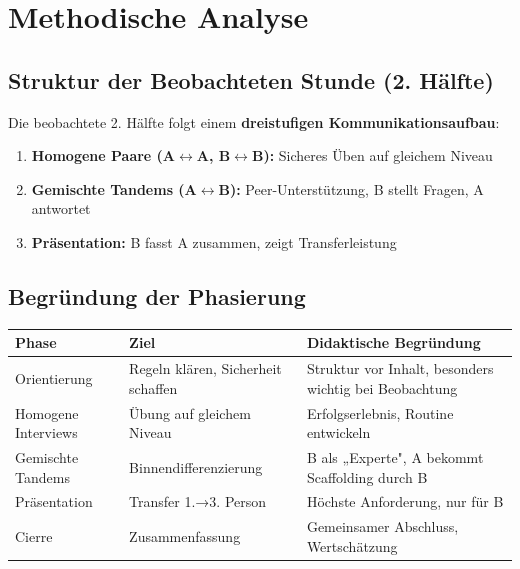 \documentclass[11pt, a4paper]{article}
\begin{document}

\section{Methodische Analyse}

\subsection{Struktur der Beobachteten Stunde (2. Hälfte)}

Die beobachtete 2. Hälfte folgt einem \textbf{dreistufigen Kommunikationsaufbau}:

\begin{enumerate}[leftmargin=2em]
    \item \textbf{Homogene Paare (A$\leftrightarrow$A, B$\leftrightarrow$B):} Sicheres Üben auf gleichem Niveau
    \item \textbf{Gemischte Tandems (A$\leftrightarrow$B):} Peer-Unterstützung, B stellt Fragen, A antwortet
    \item \textbf{Präsentation:} B fasst A zusammen, zeigt Transferleistung
\end{enumerate}

\subsection{Begründung der Phasierung}

\begin{center}
\begin{tabular}{|l|p{4.5cm}|p{5.5cm}|}
    \hline
    \textbf{Phase} & \textbf{Ziel} & \textbf{Didaktische Begründung} \\
    \hline
    Orientierung & Regeln klären, Sicherheit schaffen & Struktur vor Inhalt, besonders wichtig bei Beobachtung \\
    \hline
    Homogene Interviews & Übung auf gleichem Niveau & Erfolgserlebnis, Routine entwickeln \\
    \hline
    Gemischte Tandems & Binnendifferenzierung & B als „Experte", A bekommt Scaffolding durch B \\
    \hline
    Präsentation & Transfer 1.→3. Person & Höchste Anforderung, nur für B \\
    \hline
    Cierre & Zusammenfassung & Gemeinsamer Abschluss, Wertschätzung \\
    \hline
\end{tabular}
\end{center}
\end{document}
